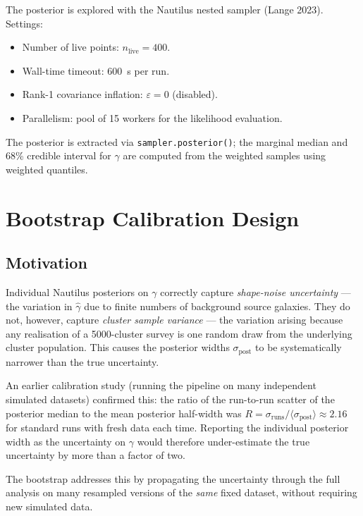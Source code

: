 \documentclass[11pt,a4paper]{article}
\begin{document}
The posterior is explored with the Nautilus nested sampler
(Lange 2023).  Settings:
\begin{itemize}
  \item Number of live points: $n_\mathrm{live} = 400$.
  \item Wall-time timeout: 600~s per run.
  \item Rank-1 covariance inflation: $\varepsilon = 0$ (disabled).
  \item Parallelism: pool of 15 workers for the likelihood evaluation.
\end{itemize}
The posterior is extracted via \texttt{sampler.posterior()};
the marginal median and 68\% credible interval for $\gamma$ are computed
from the weighted samples using weighted quantiles.

\section{Bootstrap Calibration Design}

\subsection{Motivation}
\label{sec:motivation}

Individual Nautilus posteriors on $\gamma$ correctly capture
\emph{shape-noise uncertainty} --- the variation in $\hat\gamma$ due to finite
numbers of background source galaxies.  They do not, however, capture
\emph{cluster sample variance} --- the variation arising because any realisation
of a 5000-cluster survey is one random draw from the underlying cluster
population.  This causes the posterior widths $\sigma_\mathrm{post}$ to be
systematically narrower than the true uncertainty.

An earlier calibration study (running the pipeline on many independent
simulated datasets) confirmed this: the ratio of the run-to-run scatter of the
posterior median to the mean posterior half-width was
$R = \sigma_\mathrm{runs} / \langle\sigma_\mathrm{post}\rangle \approx 2.16$
for standard runs with fresh data each time.  Reporting the individual posterior
width as the uncertainty on $\gamma$ would therefore under-estimate the true
uncertainty by more than a factor of two.

The bootstrap addresses this by propagating the uncertainty through the full
analysis on many resampled versions of the \emph{same} fixed dataset, without
requiring new simulated data.
\end{document}
